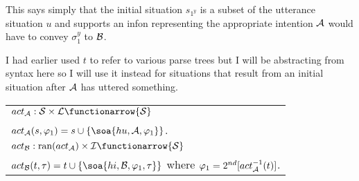 \noindent This says simply that the initial situation $s_{1^y}$ is a subset of the utterance situation $u$ and supports an infon representing the appropriate intention $\cal A$ would have to convey $\sigma_{1}^{y}$ to $\cal B$.

I had earlier used $t$ to refer to various parse trees but I will be abstracting from syntax here so I will use it instead for situations that result from an initial situation after $\cal A$ has uttered something.




%


\begin{definition}\label{def:A.2}\begin{tabular}[t]{l} 
{$act_{\cal A}: {\cal S} \times {\cal L} \functionarrow {\cal S}$}\\
\vspace{0.075in}%
{$act_{\cal A}(s,\varphi_1) = s \cup \{ \soa{hu,{\cal A},\varphi_1} \}$.}\\
{$act_{\cal B} : \hbox{ran}(act_{\cal A}) \times {\cal I} \functionarrow {\cal S}$}\\
{$act_{\cal B}(t,\tau) = t \cup \{ \soa{hi,{\cal B},\varphi_1,\tau} \}$ where $\varphi_1 = 2^{nd}[act_{\cal A}^{-1}(t)]$.}
\end{tabular} \end{definition}

